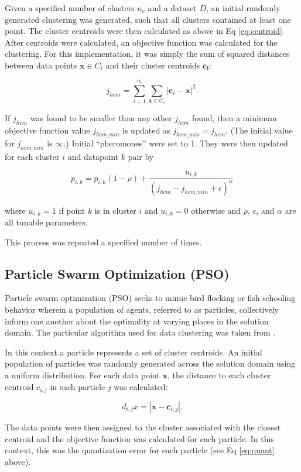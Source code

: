 \documentclass[conference]{IEEEtran}
\begin{document}
  Given a specified number of clusters $n_c$ and a dataset $D$, an initial randomly generated clustering was generated, such that all clusters contained at least one point. The cluster centroids were then calculated as above in Eq \ref{eq:centroid}. After centroids were calculated, an objective function was calculated for the clustering. For this implementation, it was simply the sum of squared distances between data points $\mathbf{x} \in C_i$ and their cluster centroids $\mathbf{c_i}$:

  $$ j_{hcm} = \sum_{i=1}^{n_c} \sum_{\mathbf{x} \in C_i} |\mathbf{c}_i - \mathbf{x}|^2 .$$

  If $j_{hcm}$ was found to be smaller than any other $j_{hcm}$ found, then a minimum objective function value $j_{hcm\_min}$ is updated as $j_{hcm\_min} = j_{hcm}$. (The initial value for $j_{hcm\_min}$ is $\infty$.)
  Initial ``pheromones'' were set to 1. They were then updated for each cluster $i$ and datapoint $k$ pair by

  $$ p_{i,k} = p_{i,k}(1 - \rho) + \frac{u_{i,k}}{(j_{hcm}-j_{hcm\_min} + \epsilon)^\alpha} $$

  where $u_{i,k} = 1$ if point $k$ is in cluster $i$ and $u_{i,k}=0$ otherwise and $\rho$, $\epsilon$, and $\alpha$ are all tunable parameters.

  This process was repeated a specified number of times.

  \subsection{Particle Swarm Optimization (PSO)}
  Particle swarm optimization (PSO) seeks to mimic bird flocking or fish schooling behavior wherein a population of agents, referred to as particles, collectively inform one another about the optimality at varying places in the solution domain. The particular algorithm used for data clustering was taken from \cite{merwe}.

  In this context a particle represents a set of cluster centroids. An initial population of particles was randomly generated across the solution domain using a uniform distribution. For each data point $\mathbf{x}$, the distance to each cluster centroid $c_{i,j}$ in each particle $j$ was calculated:

  $$ d_{i,j}{x} = |\mathbf{x} - \mathbf{c}_{i,j} | .$$

  The data points were then assigned to the cluster associated with the closest centroid and the objective function was calculated for each particle. In this context, this was the quantization error for each particle (see Eq \ref{eq:quant} above).
\end{document}
